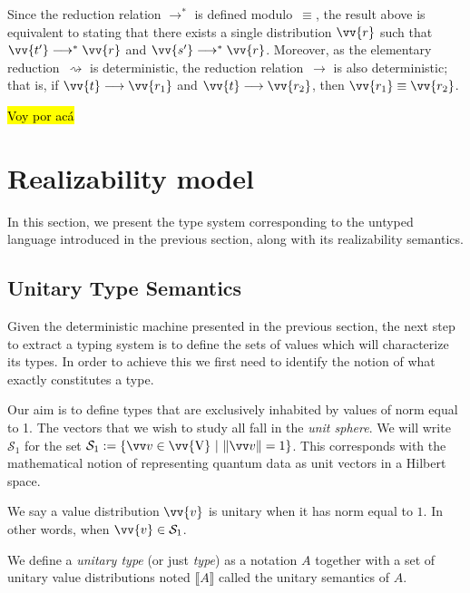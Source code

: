 \documentclass[runningheads,orivec,envcountsame,envcountsect]{llncs}
\newcommand\s[1]{\ensuremath{\mathsf{#1}}}
\newcommand\Val{{\s V}}
\newcommand\lra{\longrightarrow}
\def\Val{\mathrm{V}}          %
\def\Sph{\mathcal{S}_1}       %
\def\lraneq{\rightsquigarrow}
\def\eval{\lra^*}
\def\sem#1{\llbracket#1\rrbracket}
\begin{document}
\begin{remark}
  Since the reduction relation $\eval$ is defined modulo~$\equiv$, the result
  above is equivalent to stating that there exists a single distribution
  $\vv{r}$ such that $\vv{t'}\eval\vv{r}$ and $\vv{s'}\eval\vv{r}$.
  Moreover, as the elementary reduction~$\lraneq$ is deterministic, the
  reduction relation~$\lra$ is also deterministic; that is, if
  $\vv{t}\lra\vv{r_1}$ and $\vv{t}\lra\vv{r_2}$, then
  $\vv{r_1}\equiv\vv{r_2}$.
\end{remark}


\bigskip
\hl{Voy por acá}
\bigskip

\section{Realizability model}\label{sec:model}

In this section, we present the type system corresponding to the untyped language introduced in the previous section, along with its realizability semantics.

\subsection{Unitary Type Semantics}

Given the deterministic machine presented in the previous section, the next step to extract a typing system is to define the sets of values which will characterize its types. In order to achieve this we first need to identify the notion of what exactly constitutes a type.

Our aim is to define types that are exclusively inhabited by values of norm equal to 1. The vectors that we wish to study all fall in the \emph{unit sphere}. We will write $\Sph$ for the set $\Sph := \{\vv v \in \vv{\Val}~|~\|\vv v\| =1\}$. This corresponds with the mathematical notion of representing quantum data as unit vectors in a Hilbert space. 

\begin{definition}
  We say a value distribution $\vv{v}$ is unitary when it has norm equal to $1$. In other words, when $\vv{v}\in\Sph$.
\end{definition}

\begin{definition}
  We define a \textit{unitary type} (or just \textit{type}) as a notation $A$ together with a set of unitary value distributions noted $\sem{A}$ called the unitary semantics of $A$.
\end{definition}
\end{document}

